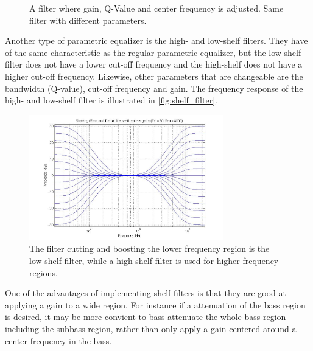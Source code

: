 \begin{figure}[H]
\centering
{}

\caption{A filter where gain, Q-Value and center frequency is adjusted. Same filter with different parameters.}
\label{fig:parametric_eq_preanalysis_comb}
\end{figure}




Another type of parametric equalizer is the high- and low-shelf filters. They have of the same characteristic as the regular parametric equalizer, but the low-shelf filter does not have a lower cut-off frequency and the high-shelf does not have a higher cut-off frequency. Likewise, other parameters that are changeable are the bandwidth (Q-value), cut-off frequency and gain. The frequency response of the high- and low-shelf filter is illustrated in \autoref{fig:shelf_filter}.

\begin{figure}[H]
\centering
\includegraphics[width=0.75\textwidth]{figures/shelf_filter.jpg}
\caption{The filter cutting and boosting the lower frequency region is the low-shelf filter, while a high-shelf filter is used for higher frequency regions.}
\label{fig:shelf_filter}
\end{figure}


One of the advantages of implementing shelf filters is that they are good at applying a gain to a wide region. For instance if a attenuation of the bass region is desired, it may be more convient to bass attenuate the whole bass region including the subbass region, rather than only apply a gain centered around a center frequency in the bass.

